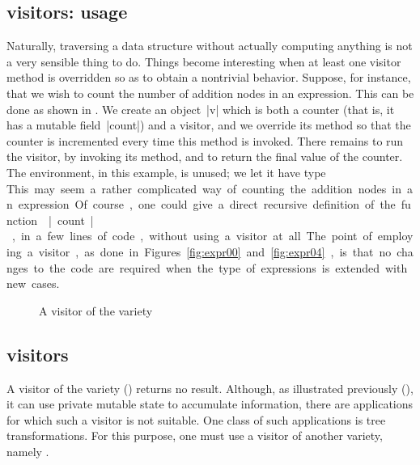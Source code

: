\documentclass[onecolumn,11pt,nocopyrightspace]{sigplanconf}
\begin{document}
\subsection{\iter visitors: usage}
\label{sec:intro:iter:usage}

Naturally, traversing a data structure without actually computing anything is
not a very sensible thing to do. Things become interesting when at least one
visitor method is overridden so as to obtain a nontrivial behavior. Suppose,
for instance, that we wish to count the number of addition nodes in an
expression. This can be done as shown in . We create an
object~\oc|v| which is both a counter (that is, it has a mutable
field~\oc|count|) and a visitor, and we override its method
 so that the counter is incremented every time this
method is invoked. There remains to run the visitor, by invoking its
 method, and to return the final value of the counter. The
environment, in this example, is unused; we let it have type \unit.

This may seem a rather complicated way of counting the addition nodes in an
expression. Of course, one could give a direct recursive definition of the
function \oc|count|, in a few lines of code, without using a visitor at all.
The point of employing a visitor, as done in Figures~\ref{fig:expr00}
and~\ref{fig:expr04}, is that no changes to the code are required when the
type of expressions is extended with new cases.


\begin{figure}[t]
\vspace{-\baselineskip}
\caption{A visitor of the \map variety}
\label{fig:expr01}
\end{figure}

\subsection{\map visitors}
\label{sec:intro:map}

A visitor of the \iter variety () returns no result.
Although, as illustrated previously (), it can use
private mutable state to accumulate information, there are applications for
which such a visitor is not suitable. One class of such applications is tree
transformations. For this purpose, one must use a visitor of another variety,
namely \map.
\end{document}

